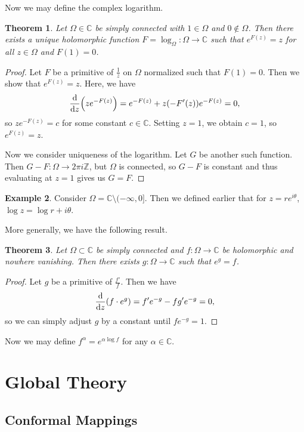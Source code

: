 \documentclass[leqno, openany]{memoir}
\newtheorem{thm}{Theorem}[section]
\theoremstyle{definition}
\newtheorem{exm}[thm]{Example}
\theoremstyle{remark}
\theoremstyle{plain}
\theoremstyle{definition}
\theoremstyle{remark}
\newcommand{\C}{\mathbb{C}}
\newcommand{\Z}{\mathbb{Z}}
\begin{document}
Now we may define the complex logarithm.

\begin{thm}
    Let $\Omega \in \C$ be simply connected with $1 \in \Omega$ and $0 \notin \Omega$. Then there exists a unique holomorphic function $F = \log_{\Omega} \colon \Omega \to \C$ such that $e^{F(z)} = z$ for all $z \in \Omega$ and $F(1) = 0$.
\end{thm}

\begin{proof}
    Let $F$ be a primitive of $\frac{1}{z}$ on $\Omega$ normalized such that $F(1) = 0$. Then we show that $e^{F(z)} = z$. Here, we have
    \[ \dv{z}(ze^{-F(z)}) = e^{-F(z)} + z(-F'(z)) e^{-F(z)} = 0, \]
    so $ze^{-F(z)} = c$ for some constant $c \in \C$. Setting $z = 1$, we obtain $c = 1$, so $e^{F(z)} = z$.

    Now we consider uniqueness of the logarithm. Let $G$ be another such function. Then $G - F \colon \Omega \to 2 \pi i \Z$, but $\Omega$ is connected, so $G-F$ is constant and thus evaluating at $z = 1$ gives us $G = F$.
\end{proof}

\begin{exm}
    Consider $\Omega = \C \setminus (-\infty, 0]$. Then we defined earlier that for $z = re^{i\theta}$, $\log z = \log r + i \theta$.
\end{exm}

More generally, we have the following result.
\begin{thm}
    Let $\Omega \subset \C$ be simply connected and $f \colon \Omega \to \C$ be holomorphic and nowhere vanishing. Then there exists $g \colon \Omega \to \C$ such that $e^g = f$.
\end{thm}

\begin{proof}
    Let $g$ be a primitive of $\frac{f'}{f}$. Then we have
    \[ \dv{z} (f \cdot e^g) = f' e^{-g} - f g' e^{-g} = 0, \]
    so we can simply adjust $g$ by a constant until $fe^{-g} = 1$.
\end{proof}

Now we may define $f^{\alpha} = e^{\alpha \log f}$ for any $\alpha \in \C$.

\chapter{Global Theory}%
\label{cha:global_theory}

\section{Conformal Mappings}%
\label{sec:conformal_mappings}
\end{document}
